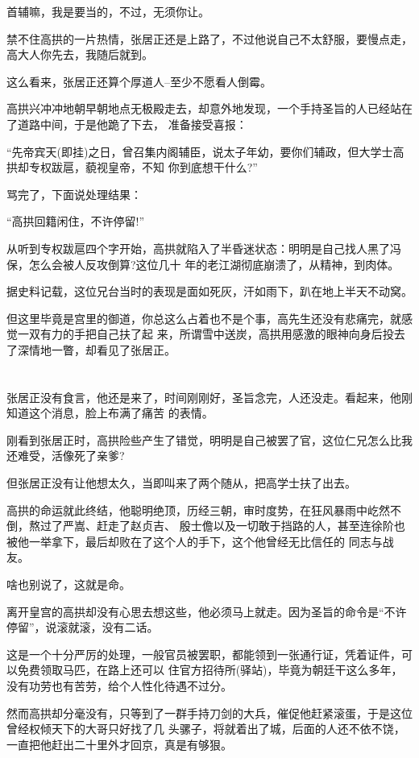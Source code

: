 \documentclass[11pt,a4paper,onecolumn]{article}
\begin{document}
首辅嘛，我是要当的，不过，无须你让。

禁不住高拱的一片热情，张居正还是上路了，不过他说自己不太舒服，要慢点走，高大人你先去，我随后就到。

这么看来，张居正还算个厚道人--至少不愿看人倒霉。

高拱兴冲冲地朝早朝地点无极殿走去，却意外地发现，一个手持圣旨的人已经站在了道路中间，于是他跪了下去，
准备接受喜报：

``先帝宾天(即挂)之日，曾召集内阁辅臣，说太子年幼，要你们辅政，但大学士高拱却专权跋扈，藐视皇帝，不知
你到底想干什么?''

骂完了，下面说处理结果：

``高拱回籍闲住，不许停留!''

从听到专权跋扈四个字开始，高拱就陷入了半昏迷状态：明明是自己找人黑了冯保，怎么会被人反攻倒算?这位几十
年的老江湖彻底崩溃了，从精神，到肉体。

据史料记载，这位兄台当时的表现是面如死灰，汗如雨下，趴在地上半天不动窝。

但这里毕竟是宫里的御道，你总这么占着也不是个事，高先生还没有悲痛完，就感觉一双有力的手把自己扶了起
来，所谓雪中送炭，高拱用感激的眼神向身后投去了深情地一瞥，却看见了张居正。

\section[\thesection]{}

张居正没有食言，他还是来了，时间刚刚好，圣旨念完，人还没走。看起来，他刚知道这个消息，脸上布满了痛苦
的表情。

刚看到张居正时，高拱险些产生了错觉，明明是自己被罢了官，这位仁兄怎么比我还难受，活像死了亲爹?

但张居正没有让他想太久，当即叫来了两个随从，把高学士扶了出去。

高拱的命运就此终结，他聪明绝顶，历经三朝，审时度势，在狂风暴雨中屹然不倒，熬过了严嵩、赶走了赵贞吉、
殷士儋以及一切敢于挡路的人，甚至连徐阶也被他一举拿下，最后却败在了这个人的手下，这个他曾经无比信任的
同志与战友。

啥也别说了，这就是命。

离开皇宫的高拱却没有心思去想这些，他必须马上就走。因为圣旨的命令是``不许停留''，说滚就滚，没有二话。

这是一个十分严厉的处理，一般官员被罢职，都能领到一张通行证，凭着证件，可以免费领取马匹，在路上还可以
住官方招待所(驿站)，毕竟为朝廷干这么多年，没有功劳也有苦劳，给个人性化待遇不过分。

然而高拱却分毫没有，只等到了一群手持刀剑的大兵，催促他赶紧滚蛋，于是这位曾经权倾天下的大哥只好找了几
头骡子，将就着出了城，后面的人还不依不饶，一直把他赶出二十里外才回京，真是有够狠。
\end{document}
